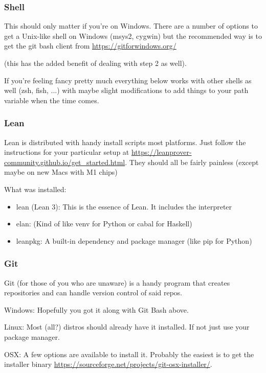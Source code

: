 \documentclass{beamer}
\begin{document}
\begin{frame}
    \frametitle{Shell}

    This should only matter if you're on Windows. There are a number of options to get a Unix-like shell on Windows (msys2, cygwin) but the recommended way is to get the git bash client from \url{https://gitforwindows.org/}

    (this has the added benefit of dealing with step 2 as well).
    \vspace{10pt}

    If you're feeling fancy pretty much everything below works with other shells as well (zsh, fish, ...) with maybe slight modifications to add things to your path variable when the time comes.
    

\end{frame}
\begin{frame}
    \frametitle{Lean}

    Lean is distributed with handy install scripts most platforms. Just follow the instructions for your particular setup at \url{https://leanprover-community.github.io/get_started.html}. They should all be fairly painless (except maybe on new Macs with M1 chips)
    \vspace{10pt}

    What was installed:
    \begin{itemize}
        \item lean (Lean 3): This is the essence of Lean. It includes the interpreter
        \item elan: (Kind of like venv for Python or cabal for Haskell)
        \item leanpkg: A built-in dependency and package manager (like pip for Python)
    \end{itemize}

\end{frame}

\begin{frame}
    \frametitle{Git}

    Git (for those of you who are unaware) is a handy program that creates repositories and can handle version control of said repos. 
    \vspace{10pt}

    Windows: Hopefully you got it along with Git Bash above. 
    \vspace{10pt}

    Linux: Most (all?) distros should already have it installed. If not just use your package manager.
    \vspace{10pt}

    OSX: A few options are available to install it. Probably the easiest is to get the installer binary \url{https://sourceforge.net/projects/git-osx-installer/}.
    \vspace{10pt}
\end{frame}
\end{document}
